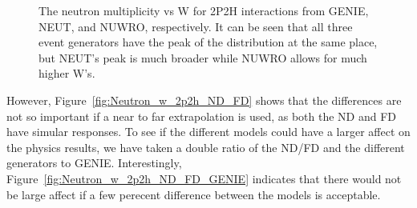 \documentclass[12pt]{article}
\begin{document}
\begin{figure}
\begin{subfigure}[b]{0.32\textwidth}
\end{subfigure}
\caption{The neutron multiplicity vs W for 2P2H interactions from GENIE, NEUT, and NUWRO, respectively.  It can be seen that all three event generators have the peak of the distribution at the same place, but NEUT's peak is much broader while NUWRO allows for much higher W's.}
\label{fig:Neutron_w_2p2h_ND}
\end{figure}

However, Figure~\ref{fig:Neutron_w_2p2h_ND_FD} shows that the differences are not so important if a near to far extrapolation is used, as both the ND and FD have simular responses.
To see if the different models could have a larger affect on the physics results, we have taken a double ratio of the ND/FD and the different generators to GENIE.  
Interestingly, Figure~\ref{fig:Neutron_w_2p2h_ND_FD_GENIE} indicates that there would not be large affect if a few perecent difference between the models is acceptable.
\end{document}
